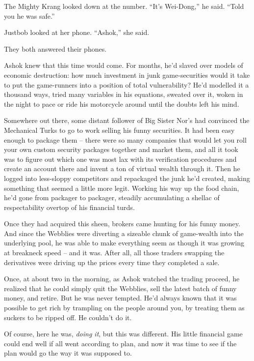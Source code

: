 The Mighty Krang looked down at the number. ``It's Wei-Dong,'' he
said. ``Told you he was safe.''

Justbob looked at her phone. ``Ashok,'' she said.

They both answered their phones.

\tb

Ashok knew that this time would come. For months, he'd slaved over
models of economic destruction: how much investment in junk
game-securities would it take to put the game-runners into a
position of total vulnerability? He'd modelled it a thousand ways,
tried many variables in his equations, sweated over it, woken in
the night to pace or ride his motorcycle around until the doubts
left his mind.

Somewhere out there, some distant follower of Big Sister Nor's had
convinced the Mechanical Turks to go to work selling his funny
securities. It had been easy enough to package them -- there were
so many companies that would let you roll your own custom security
packages together and market them, and all it took was to figure
out which one was most lax with its verification procedures and
create an account there and invent a ton of virtual wealth through
it. Then he logged into less-sloppy competitors and repackaged the
junk he'd created, making something that seemed a little more
legit. Working his way up the food chain, he'd gone from packager
to packager, steadily accumulating a shellac of respectability
overtop of his financial turds.

Once they had acquired this sheen, brokers came hunting for his
funny money. And since the Webblies were diverting a sizeable chunk
of game-wealth into the underlying pool, he was able to make
everything seem as though it was growing at breakneck speed -- and
it was. After all, all those traders swapping the derivatives were
driving up the prices every time they completed a sale.

Once, at about two in the morning, as Ashok watched the trading
proceed, he realized that he could simply quit the Webblies, sell
the latest batch of funny money, and retire. But he was never
tempted. He'd always known that it was possible to get rich by
trampling on the people around you, by treating them as suckers to
be ripped off. He couldn't do it.

Of course, here he was, \emph{doing it}, but this was different.
His little financial game could end well if all went according to
plan, and now it was time to see if the plan would go the way it
was supposed to.

